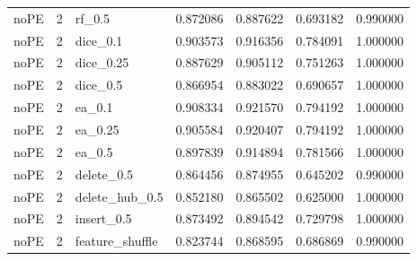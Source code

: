 \documentclass[UTF8,a4paper,11pt,fontset=fandol]{ctexart}
\begin{document}
{\begin{longtable}{lrlrrrr}
noPE & 2 & rf\_0.5 & 0.872086 & 0.887622 & 0.693182 & 0.990000 \\
noPE & 2 & dice\_0.1 & 0.903573 & 0.916356 & 0.784091 & 1.000000 \\
noPE & 2 & dice\_0.25 & 0.887629 & 0.905112 & 0.751263 & 1.000000 \\
noPE & 2 & dice\_0.5 & 0.866954 & 0.883022 & 0.690657 & 1.000000 \\
noPE & 2 & ea\_0.1 & 0.908334 & 0.921570 & 0.794192 & 1.000000 \\
noPE & 2 & ea\_0.25 & 0.905584 & 0.920407 & 0.794192 & 1.000000 \\
noPE & 2 & ea\_0.5 & 0.897839 & 0.914894 & 0.781566 & 1.000000 \\
noPE & 2 & delete\_0.5 & 0.864456 & 0.874955 & 0.645202 & 0.990000 \\
noPE & 2 & delete\_hub\_0.5 & 0.852180 & 0.865502 & 0.625000 & 1.000000 \\
noPE & 2 & insert\_0.5 & 0.873492 & 0.894542 & 0.729798 & 1.000000 \\
noPE & 2 & feature\_shuffle & 0.823744 & 0.868595 & 0.686869 & 0.990000 \\
\end{longtable}
}
\end{document}

